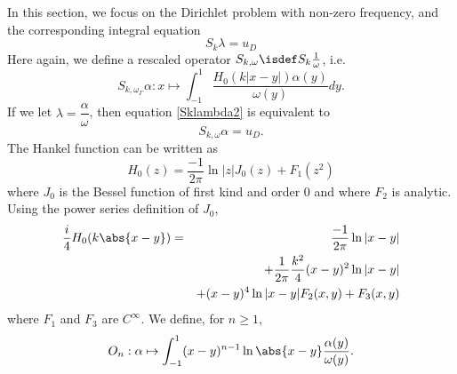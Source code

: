 \documentclass[a4paper]{article}
\begin{document}
In this section, we focus on the Dirichlet problem with non-zero frequency, and the corresponding integral equation 
\begin{equation}
S_k \lambda = u_D
\label{Sklambda2}
\end{equation}
Here again, we define a rescaled operator $S_{k,\omega} \isdef S_k \frac{1}{\omega}$, i.e.
\[S_{k,\omega_{\Gamma}}\alpha : x \mapsto \int_{-1}^1 \dfrac{H_0(k|x-y|) \alpha(y)}{\omega(y)}dy.\]
If we let $\lambda = \dfrac{\alpha}{\omega}$, then equation \eqref{Sklambda2} is equivalent to
\[S_{k,\omega}\alpha = u_D.\]
The Hankel function can be written as 
\[H_0(z) = \frac{-1}{2\pi}\ln|z| J_0(z) + F_1(z^2)\]
where $J_0$ is the Bessel function of first kind and order $0$ and where $F_2$ is analytic. Using the power series definition of $J_0$, 
\begin{eqnarray*}
	\frac{i}{4}H_0(k \abs{x - y}) &=& \frac{-1}{2\pi}\ln |x-y|\\ 
	&&+ \frac{1}{2\pi} \frac{k^2}{4} (x- y)^2 \ln |x-y|\\
	&& + (x-y)^4 \ln|x-y|F_2(x,y) + F_3(x,y)
\end{eqnarray*}
where $F_1$ and $F_3$ are $C^{\infty}$. We define, for $n \geq 1$, 
\[O_n : \alpha \mapsto \int_{-1}^{1}(x-y)^{n-1} \ln\abs{x - y} \frac{\alpha(y)}{\omega(y)}.\]
\end{document}
